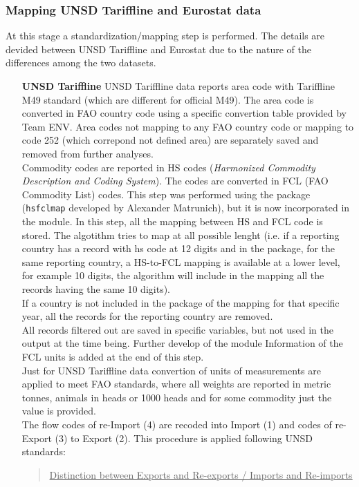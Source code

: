 \documentclass[nojss]{jss}\usepackage[]{graphicx}\usepackage[]{color}
\begin{document}
\subsubsection{Mapping UNSD Tariffline and Eurostat data}
At this stage a standardization/mapping step is performed. The details are devided between UNSD Tariffline and Eurostat due to the nature of the differences among the two datasets.
\begin{itemize}
\item [\bf{UNSD Tariffline}]
UNSD Tariffline data reports area code with Tariffline M49 standard (which are different for official M49). The area code is converted in FAO country code using a specific convertion table provided by Team ENV. Area codes not mapping to any FAO country code or mapping to code 252 (which correpond not defined area) are separately saved and removed from further analyses.\\
Commodity codes are reported in HS codes ({\it Harmonized Commodity Description and Coding System}). The codes are converted in FCL (FAO Commodity List) codes. This step was performed using the package ({\tt hsfclmap} developed by Alexander Matrunich), but it is now incorporated in the module. In this step, all the mapping between HS and FCL code is stored. The algotithm tries to map at all possible lenght (i.e. if a reporting country has a record with hs code at 12 digits and in the package, for the same reporting country, a HS-to-FCL mapping is available at a lower level, for example 10 digits, the algorithm will include in the mapping all the records having the same 10 digits).\\
If a country is not included in the package of the mapping for that specific year, all the records for the reporting country are removed.\\ All records filtered out are saved in specific variables, but not used in the output at the time being. Further develop of the module
Information of the FCL units is added at the end of this step.\\
Just for UNSD Tariffline data convertion of units of measurements are applied to meet FAO standards, where all weights are reported in metric tonnes, animals in heads or 1000 heads and for some commodity just the value is provided.\\
The flow codes of re-Import (4) are recoded into Import (1) and codes of re-Export (3) to Export (2). This procedure is applied following UNSD standards:
\begin{quote}
\underline{Distinction between Exports and Re-exports / Imports and Re-imports}\\

\end{quote}
\end{itemize}
\end{document}
